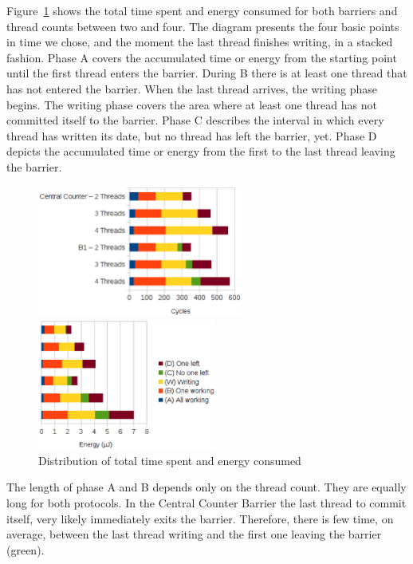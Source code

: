 \documentclass[a4paper, 10pt]{article}
\begin{document}
Figure~\ref{fig:c1-work-100-partition} shows the total time spent and energy consumed for both barriers and thread counts between two and four.
The diagram presents the four basic points in time we chose, and the moment the last thread finishes writing, in a stacked fashion.
Phase A covers the accumulated time or energy from the starting point until the first thread enters the barrier.
During B there is at least one thread that has not entered the barrier. When the last thread arrives, the writing phase begins.
The writing phase covers the area where at least one thread has not committed itself to the barrier.
Phase C describes the interval in which every thread has written its date, but no thread has left the barrier, yet.
Phase D depicts the accumulated time or energy from the first to the last thread leaving the barrier.
\begin{figure}[htbp]
	\centering
	\begin{minipage}{0.53\linewidth}
		\includegraphics[height=4.3cm]{charts/c1-time-work-100-partition}
	\end{minipage}
	\begin{minipage}{0.46\linewidth}
		\includegraphics[height=4.3cm]{charts/c1-energy-work-100-partition}
	\end{minipage}
	\caption{Distribution of total time spent and energy consumed}
	\label{fig:c1-work-100-partition}
\end{figure}

The length of phase A and B depends only on the thread count. They are equally long for both protocols.
In the Central Counter Barrier the last thread to commit itself, very likely immediately exits the barrier. Therefore, there is few time, on average, between the last thread writing and the first one leaving the barrier (green).
\end{document}
